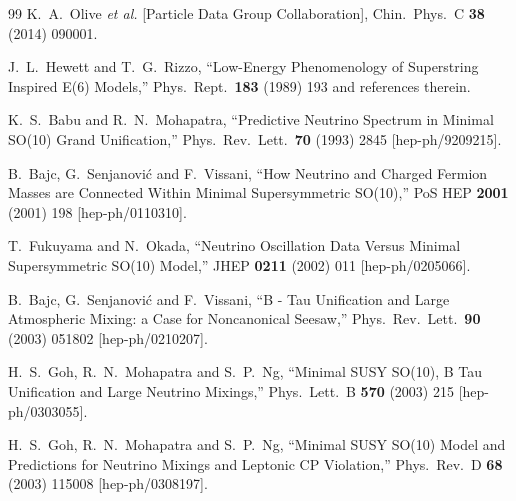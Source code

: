 \documentclass[a4paper,12pt]{article}
\begin{document}
\begin{thebibliography}{99}
  K.~A.~Olive {\it et al.}  [Particle Data Group Collaboration],
  Chin.\ Phys.\ C {\bf 38} (2014) 090001.

J.~L.~Hewett and T.~G.~Rizzo,
 ``Low-Energy Phenomenology of Superstring Inspired E(6) Models,''
  Phys.\ Rept.\  {\bf 183} (1989) 193 and references therein.


K.~S.~Babu and R.~N.~Mohapatra,
``Predictive Neutrino Spectrum in Minimal SO(10) Grand Unification,''
Phys.\ Rev.\ Lett.\ {\bf 70} (1993) 2845
[hep-ph/9209215].


B.~Bajc, G.~Senjanovi\'c and F.~Vissani,
``How Neutrino and Charged Fermion Masses are Connected Within Minimal Supersymmetric SO(10),''
PoS HEP {\bf 2001} (2001) 198
[hep-ph/0110310].


T.~Fukuyama and N.~Okada,
``Neutrino Oscillation Data Versus Minimal Supersymmetric SO(10) Model,''
JHEP {\bf 0211} (2002) 011
[hep-ph/0205066].


B.~Bajc, G.~Senjanovi\'c and F.~Vissani,
``B - Tau Unification and Large Atmospheric Mixing: a Case for Noncanonical Seesaw,''
Phys.\ Rev.\ Lett.\ {\bf 90} (2003) 051802
[hep-ph/0210207].


H.~S.~Goh, R.~N.~Mohapatra and S.~P.~Ng,
``Minimal SUSY SO(10), B Tau Unification and Large Neutrino Mixings,''
Phys.\ Lett.\ B {\bf 570} (2003) 215
[hep-ph/0303055].


H.~S.~Goh, R.~N.~Mohapatra and S.~P.~Ng,
``Minimal SUSY SO(10) Model and Predictions for Neutrino Mixings and Leptonic CP Violation,''
Phys.\ Rev.\ D {\bf 68} (2003) 115008
[hep-ph/0308197].



\end{thebibliography}
\end{document}
